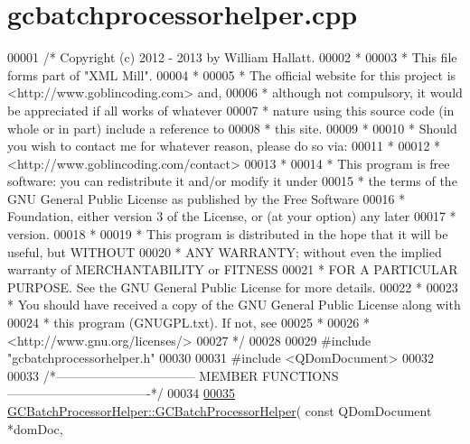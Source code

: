 \hypertarget{gcbatchprocessorhelper_8cpp_source}{\section{gcbatchprocessorhelper.\-cpp}
}

\begin{DoxyCode}
00001 \textcolor{comment}{/* Copyright (c) 2012 - 2013 by William Hallatt.}
00002 \textcolor{comment}{ *}
00003 \textcolor{comment}{ * This file forms part of "XML Mill".}
00004 \textcolor{comment}{ *}
00005 \textcolor{comment}{ * The official website for this project is <http://www.goblincoding.com> and,}
00006 \textcolor{comment}{ * although not compulsory, it would be appreciated if all works of whatever}
00007 \textcolor{comment}{ * nature using this source code (in whole or in part) include a reference to}
00008 \textcolor{comment}{ * this site.}
00009 \textcolor{comment}{ *}
00010 \textcolor{comment}{ * Should you wish to contact me for whatever reason, please do so via:}
00011 \textcolor{comment}{ *}
00012 \textcolor{comment}{ *                 <http://www.goblincoding.com/contact>}
00013 \textcolor{comment}{ *}
00014 \textcolor{comment}{ * This program is free software: you can redistribute it and/or modify it
       under}
00015 \textcolor{comment}{ * the terms of the GNU General Public License as published by the Free
       Software}
00016 \textcolor{comment}{ * Foundation, either version 3 of the License, or (at your option) any later}
00017 \textcolor{comment}{ * version.}
00018 \textcolor{comment}{ *}
00019 \textcolor{comment}{ * This program is distributed in the hope that it will be useful, but WITHOUT}
00020 \textcolor{comment}{ * ANY WARRANTY; without even the implied warranty of MERCHANTABILITY or
       FITNESS}
00021 \textcolor{comment}{ * FOR A PARTICULAR PURPOSE.  See the GNU General Public License for more
       details.}
00022 \textcolor{comment}{ *}
00023 \textcolor{comment}{ * You should have received a copy of the GNU General Public License along with}
00024 \textcolor{comment}{ * this program (GNUGPL.txt).  If not, see}
00025 \textcolor{comment}{ *}
00026 \textcolor{comment}{ *                    <http://www.gnu.org/licenses/>}
00027 \textcolor{comment}{ */}
00028 
00029 \textcolor{preprocessor}{#include "gcbatchprocessorhelper.h"}
00030 
00031 \textcolor{preprocessor}{#include <QDomDocument>}
00032 
00033 \textcolor{comment}{/*--------------------------------- MEMBER FUNCTIONS
       ----------------------------------*/}
00034 
\hypertarget{gcbatchprocessorhelper_8cpp_source_l00035}{}\hyperlink{class_g_c_batch_processor_helper_a36b76739cc2d64ab72e9d9b68425a7f1}{00035} \hyperlink{class_g_c_batch_processor_helper_a36b76739cc2d64ab72e9d9b68425a7f1}{GCBatchProcessorHelper::GCBatchProcessorHelper}( \textcolor{keyword}{const} QDomDocument *domDoc,

\end{DoxyCode}
